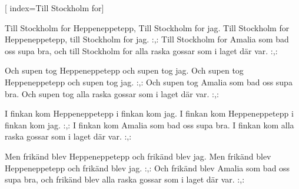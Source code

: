[ 						
	index={Till Stockholm for}]		
	
\beginverse*						
Till Stockholm for Heppeneppetepp, 
Till Stockholm for jag.
Till Stockholm for Heppeneppetepp,
till Stockholm for jag.
:,: Till Stockholm for Amalia
som bad oss supa bra, 
och till Stockholm for alla raska gossar
som i laget där var. :,:
\endverse						

\beginverse				
Och supen tog Heppeneppetepp
och supen tog jag.
Och supen tog Heppeneppetepp
och supen tog jag.
:,: Och supen tog Amalia
som bad oss supa bra.
Och supen tog alla raska gossar som i laget där var. :,:
\endverse		

\beginverse
I finkan kom Heppeneppetepp
i finkan kom jag. 
I finkan kom Heppeneppetepp
i finkan kom jag.
:,: I finkan kom Amalia 
som bad oss supa bra.
I finkan kom alla raska gossar
som i laget där var. :,:
\endverse

\beginverse
Men frikänd blev Heppeneppetepp
och frikänd blev jag. 
Men frikänd blev Heppeneppetepp
och frikänd blev jag. 
:,: Och frikänd blev Amalia 
som bad oss supa bra, 
och frikänd blev alla raska gossar
som i laget där var. :,:
\endverse		
\endsong		

